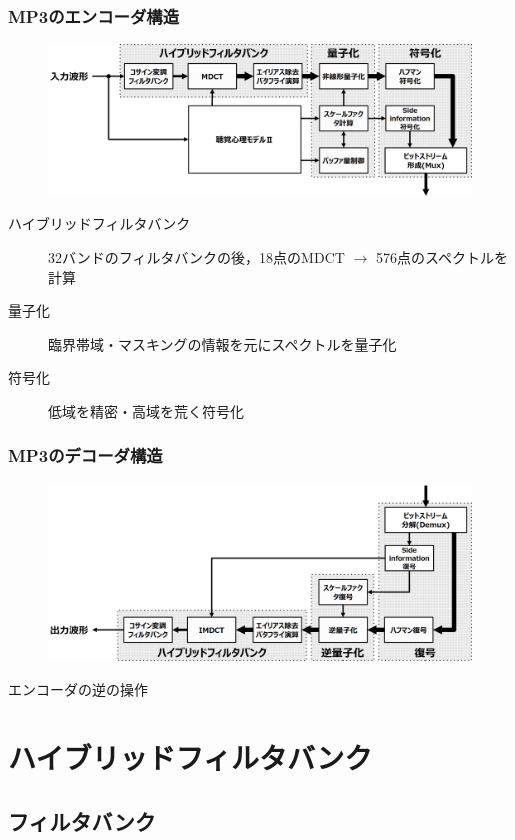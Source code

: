 \documentclass[14pt,xcolor=dvipsnames,table,dvipdfmx]{beamer}
\begin{document}
\begin{frame}[c]
    \frametitle{MP3のエンコーダ構造}
    \begin{figure}
        \includegraphics[width=115mm]{./figs/mp3_encoder_struct.png}
    \end{figure}
    \begin{description}
        \item[ハイブリッドフィルタバンク] 32バンドのフィルタバンクの後，18点のMDCT $\rightarrow$ 576点のスペクトルを計算
        \item[量子化] 臨界帯域・マスキングの情報を元にスペクトルを量子化
        \item[符号化] 低域を精密・高域を荒く符号化
    \end{description}
\end{frame}

\begin{frame}[c]
    \frametitle{MP3のデコーダ構造}
    \begin{figure}
        \includegraphics[width=115mm]{./figs/mp3_decoder_struct.png}
    \end{figure}
    エンコーダの逆の操作
\end{frame}

\section{ハイブリッドフィルタバンク}

\subsection{フィルタバンク}
\end{document}
